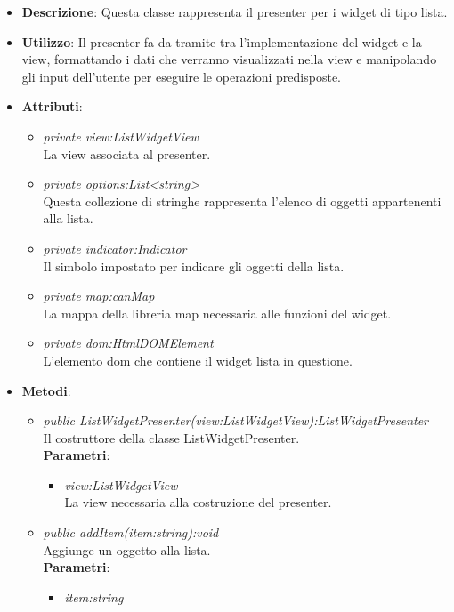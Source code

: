 \begin{itemize}
\item \textbf{Descrizione}: Questa classe rappresenta il presenter per i widget di tipo lista.
\item \textbf{Utilizzo}: Il presenter fa da tramite tra l'implementazione del widget e la view, formattando i dati che verranno visualizzati nella view e manipolando gli input dell'utente per eseguire le operazioni predisposte.
\item \textbf{Attributi}:
	\begin{itemize}
	\item \textit{private view:ListWidgetView}\\
	La view associata al presenter.
	\item \textit{private options:List<string>}\\
	Questa collezione di stringhe rappresenta l'elenco di oggetti appartenenti alla lista.
	\item \textit{private indicator:Indicator}\\
	Il simbolo impostato per indicare gli oggetti della lista.
	\item \textit{private map:canMap}\\
	La mappa della libreria map necessaria alle funzioni del widget.
	\item \textit{private dom:HtmlDOMElement}\\
	L'elemento dom che contiene il widget lista in questione.
	\end{itemize}
\item \textbf{Metodi}:
	\begin{itemize}
	\item \textit{public ListWidgetPresenter(view:ListWidgetView):ListWidgetPresenter}\\
	Il costruttore della classe ListWidgetPresenter.
		\\ \textbf{Parametri}: \begin{itemize}
		\item \textit{view:ListWidgetView}\\
		La view necessaria alla costruzione del presenter.
		\end{itemize} 
	\item \textit{public addItem(item:string):void}\\
	Aggiunge un oggetto alla lista.
		\\ \textbf{Parametri}: \begin{itemize}
		\item \textit{item:string}\\

\end{itemize}
\end{itemize}
\end{itemize}
